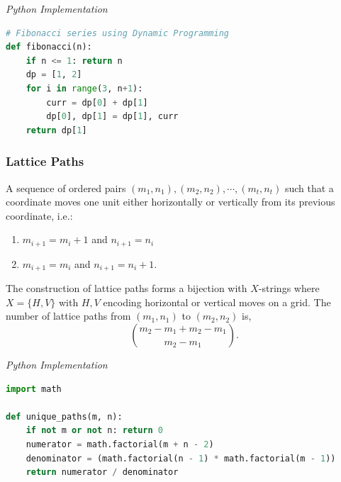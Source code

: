 \documentclass{article}
\begin{document}
\vspace{8pt} \emph{Python Implementation}
\begin{lstlisting}[language=Python]
# Fibonacci series using Dynamic Programming  
def fibonacci(n):
    if n <= 1: return n
    dp = [1, 2]
    for i in range(3, n+1):
        curr = dp[0] + dp[1]
        dp[0], dp[1] = dp[1], curr
    return dp[1]
\end{lstlisting}

    \subsubsection{Lattice Paths}

    A sequence of ordered pairs $(m_1, n_1), (m_2, n_2), \cdots, (m_t, n_t)$ such that a coordinate moves one unit either horizontally or vertically from its previous coordinate, i.e.:
    \begin{enumerate}
        \item $m_{i+1} = m_{i}+1$ and $n_{i+1} = n_{i}$
        \item $m_{i+1} = m_i$ and $n_{i+1} = n_i +1$.
    \end{enumerate}
    The construction of lattice paths forms a bijection with $X$-strings where $X = \{ H, V\}$ with $H,V$ encoding horizontal or vertical moves on a grid. The number of lattice paths from $(m_1, n_1)$ to $(m_2,n_2)$ is,
    \[
       \binom{m_2 - m_1 + m_2 - m_1}{m_2-m_1}.
    \]

\vspace{8pt} \emph{Python Implementation}
\begin{lstlisting}[language=Python]
import math

def unique_paths(m, n):
    if not m or not n: return 0
    numerator = math.factorial(m + n - 2)
    denominator = (math.factorial(n - 1) * math.factorial(m - 1))
    return numerator / denominator
\end{lstlisting}
\end{document}
